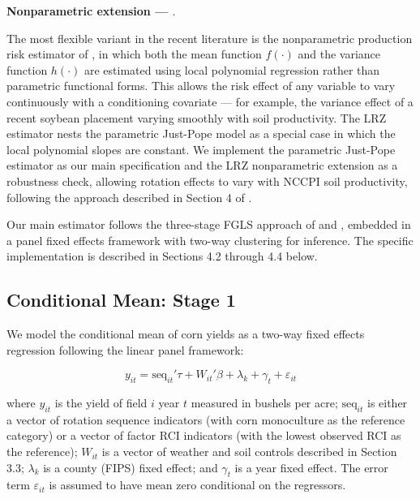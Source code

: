 \documentclass[12pt,letterpaper]{article}
\theoremstyle{remark}
\theoremstyle{plain}
\theoremstyle{definition}
\begin{document}
\textbf{Nonparametric extension — \cite{li2021}}. 

The most flexible variant in the recent literature is the nonparametric production risk estimator of \cite{li2021}, in which both the mean function $f(\cdot)$ and the variance function $h(\cdot)$ are estimated using local polynomial regression rather than parametric functional forms. This allows the risk effect of any variable to vary continuously with a conditioning covariate — for example, the variance effect of a recent soybean placement varying smoothly with soil productivity. The LRZ estimator nests the parametric Just-Pope model as a special case in which the local polynomial slopes are constant. We implement the parametric Just-Pope estimator as our main specification and the LRZ nonparametric extension as a robustness check, allowing rotation effects to vary with NCCPI soil productivity, following the approach described in Section 4 of \cite{li2021}.

Our main estimator follows the three-stage FGLS approach of \cite{Harvey1976} and \cite{Saha1997}, embedded in a panel fixed effects framework with two-way clustering for inference. The specific implementation is described in Sections 4.2 through 4.4 below.

\subsection{\label{subsec:stage_1}Conditional Mean: Stage 1}
We model the conditional mean of corn yields as a two-way fixed effects regression following the linear panel framework:

\begin{equation}
    y_{it}=\text{seq}_{it}'\tau+ W_{it}'\beta+\lambda_{k}+\gamma_{t}+\varepsilon_{it}
\end{equation}

where $y_{it}$ is the yield of field $i$ year $t$ measured in bushels per acre; $\text{seq}_{it}$ is either a vector of rotation sequence indicators (with corn monoculture as the reference category) or a vector of factor RCI indicators (with the lowest observed RCI as the reference); $W_{it}$ is a vector of weather and soil controls described in Section 3.3; $\lambda_{k}$ is a county (FIPS) fixed effect; and $\gamma_{t}$ is a year fixed effect. The error term $\varepsilon_{it}$ is assumed to
have mean zero conditional on the regressors.
\end{document}
